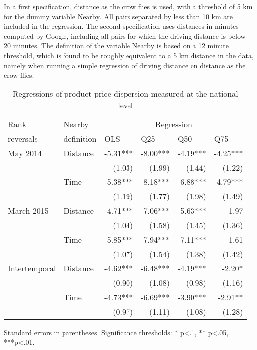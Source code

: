\documentclass[english]{article}
\begin{document}
In a first specification, distance as the crow flies is used, with a threshold of 5 km for the dummy variable $\text{Nearby}$. All pairs separated by less than 10 km are included in the regression. The second specification uses distances in minutes computed by Google, including all pairs for which the driving distance is below 20 minutes. The definition of the variable $\text{Nearby}$ is based on a 12 minute threshold, which is found to be roughly equivalent to a 5 km distance in the data, namely when running a simple regression of driving distance on distance as the crow flies.

\begin{table}
\caption{Regressions of product price dispersion measured at the national level}
\label{tab:reg_rank_reversals}
\begin{threeparttable}
\begin{tabular}{rrrrrr}
    \toprule
    \toprule
    \multicolumn{1}{l}{Rank} & \multicolumn{1}{l}{Nearby} & \multicolumn{4}{c}{Regression} \\
    \multicolumn{1}{l}{reversals} & \multicolumn{1}{l}{definition} & \multicolumn{1}{l}{OLS} & \multicolumn{1}{l}{Q25} & \multicolumn{1}{l}{Q50} & \multicolumn{1}{l}{Q75} \\
    \midrule
    \multicolumn{1}{l}{May 2014} & \multicolumn{1}{l}{Distance} & -5.31*** & -8.00*** & -4.19*** & -4.25*** \\
          &       & (1.03) & (1.99) & (1.44) & (1.22) \\
          & \multicolumn{1}{l}{Time} & -5.38*** & -8.18*** & -6.88*** & -4.79*** \\
          &       & (1.19) & (1.77) & (1.98) & (1.49) \\
    \midrule
    \multicolumn{1}{l}{March 2015} & \multicolumn{1}{l}{Distance} & -4.71*** & -7.06*** & -5.63*** & -1.97 \\
          &       & (1.04) & (1.58) & (1.45) & (1.36) \\
          & \multicolumn{1}{l}{Time} & -5.85*** & -7.94*** & -7.11*** & -1.61 \\
          &       & (1.07) & (1.54) & (1.38) & (1.42) \\
    \midrule
    \multicolumn{1}{l}{Intertemporal} & \multicolumn{1}{l}{Distance} & -4.62*** & -6.48*** & -4.19*** & -2.20* \\
          &       & (0.90) & (1.08) & (0.98) & (1.16) \\
          & \multicolumn{1}{l}{Time} & -4.73*** & -6.69*** & -3.90*** & -2.91** \\
          &       & (0.97) & (1.11) & (1.08) & (1.28) \\
    \bottomrule
    \bottomrule
\end{tabular}
\begin{tablenotes}
      \small
	  \item Standard errors in parentheses. Significance thresholds: * p<.1, ** p<.05, ***p<.01.
\end{tablenotes}
\end{threeparttable}
\end{table}
\end{document}
